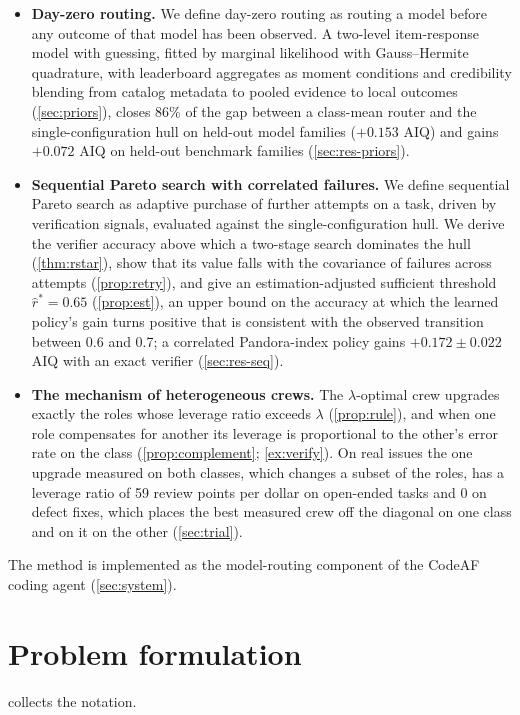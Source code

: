\documentclass[11pt,a4paper]{article}
\theoremstyle{definition}
\theoremstyle{remark}
\theoremstyle{definition}
\begin{document}
\begin{itemize}
\item \textbf{Day-zero routing.} We define day-zero routing as routing a model before any outcome of that model has been observed. A two-level item-response model with guessing, fitted by marginal likelihood with Gauss--Hermite quadrature, with leaderboard aggregates as moment conditions and credibility blending from catalog metadata to pooled evidence to local outcomes (\cref{sec:priors}), closes 86\% of the gap between a class-mean router and the single-configuration hull on held-out model families ($+0.153$ AIQ) and gains $+0.072$ AIQ on held-out benchmark families (\cref{sec:res-priors}).
\item \textbf{Sequential Pareto search with correlated failures.} We define sequential Pareto search as adaptive purchase of further attempts on a task, driven by verification signals, evaluated against the single-configuration hull. We derive the verifier accuracy above which a two-stage search dominates the hull (\cref{thm:rstar}), show that its value falls with the covariance of failures across attempts (\cref{prop:retry}), and give an estimation-adjusted sufficient threshold $\hat r^\ast=0.65$ (\cref{prop:est}), an upper bound on the accuracy at which the learned policy's gain turns positive that is consistent with the observed transition between 0.6 and 0.7; a correlated Pandora-index policy gains $+0.172\pm0.022$ AIQ with an exact verifier (\cref{sec:res-seq}).
\item \textbf{The mechanism of heterogeneous crews.} The $\lambda$-optimal crew upgrades exactly the roles whose leverage ratio exceeds $\lambda$ (\cref{prop:rule}), and when one role compensates for another its leverage is proportional to the other's error rate on the class (\cref{prop:complement}; \cref{ex:verify}). On real issues the one upgrade measured on both classes, which changes a subset of the roles, has a leverage ratio of 59 review points per dollar on open-ended tasks and 0 on defect fixes, which places the best measured crew off the diagonal on one class and on it on the other (\cref{sec:trial}).
\end{itemize}
The method is implemented as the model-routing component of the CodeAF coding agent (\cref{sec:system}).

\section{Problem formulation}
\label{sec:problem}
 collects the notation.
\end{document}
